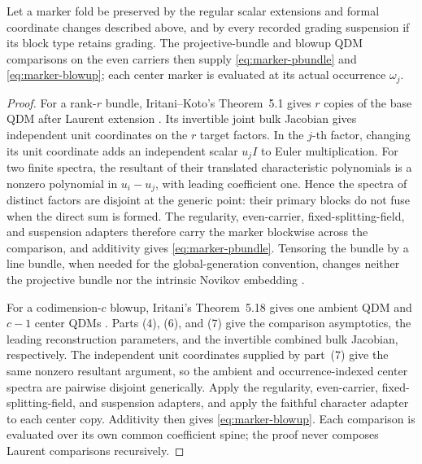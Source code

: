 \begin{proposition}
\label{prop:qdm-operation-ledgers}
%
%
%
Let a marker fold be preserved by the regular scalar extensions and formal
coordinate changes described above, and by every recorded grading suspension
if its block type retains grading.  The projective-bundle and blowup QDM
comparisons on the even carriers then supply \eqref{eq:marker-pbundle} and
\eqref{eq:marker-blowup}; each center marker is evaluated at its actual
occurrence \(\omega_j\).
\end{proposition}

\begin{proof}
For a rank-\(r\) bundle, Iritani--Koto's Theorem~5.1 gives \(r\) copies of
the base QDM after Laurent extension \cite[Theorem~5.1]{IritaniKoto}.  Its
invertible joint bulk Jacobian gives independent unit coordinates on the
\(r\) target factors.  In the \(j\)-th factor, changing its unit coordinate
adds an independent scalar \(u_jI\) to Euler multiplication.  For two finite
spectra, the resultant of their translated characteristic polynomials is a
nonzero polynomial in \(u_i-u_j\), with leading coefficient one.  Hence the
spectra of distinct factors are disjoint at the generic point: their primary
blocks do not fuse when the direct sum is formed.  The regularity, even-carrier,
fixed-splitting-field, and suspension adapters therefore carry the marker
blockwise across the comparison, and additivity gives
\eqref{eq:marker-pbundle}.  Tensoring the bundle by a line bundle, when needed
for the global-generation convention, changes neither the projective bundle
nor the intrinsic Novikov embedding
\cite[Remark~1.2 and Remark~5.2]{IritaniKoto}.

For a codimension-\(c\) blowup, Iritani's Theorem~5.18 gives one ambient QDM
and \(c-1\) center QDMs \cite[Theorem~5.18]{IritaniBlowup}.  Parts (4), (6),
and (7) give the comparison asymptotics, the leading reconstruction
parameters, and the invertible combined bulk Jacobian, respectively.  The
independent unit coordinates supplied by part~(7) give the same nonzero
resultant argument, so the ambient and occurrence-indexed center spectra are
pairwise disjoint generically.  Apply the regularity, even-carrier,
fixed-splitting-field, and suspension adapters, and apply the faithful
character adapter to each center copy.  Additivity then gives
\eqref{eq:marker-blowup}.  Each comparison is evaluated over its own common
coefficient spine; the proof never composes Laurent comparisons recursively.
\end{proof}

